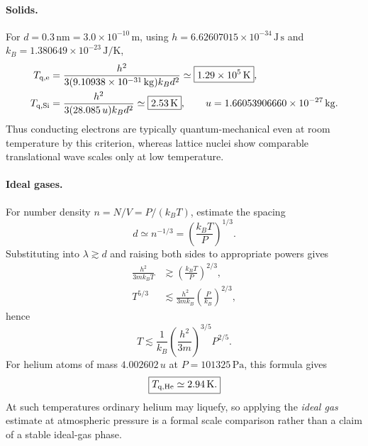 \paragraph{Solids.}
For $d=0.3\,\mathrm{nm}=3.0\times10^{-10}\,\mathrm{m}$, using $h=6.62607015\times10^{-34}\,\mathrm{J\,s}$ and $k_B=1.380649\times10^{-23}\,\mathrm{J/K}$,
\begin{align}
T_{\rm q,e}&=
\frac{h^2}{3(9.10938\times10^{-31}\,\mathrm{kg})k_Bd^2}
\simeq\boxed{1.29\times10^5\,\mathrm K},\\
T_{\rm q,Si}&=
\frac{h^2}{3(28.085\,u)k_Bd^2}
\simeq\boxed{2.53\,\mathrm K},\qquad
u=1.66053906660\times10^{-27}\,\mathrm{kg}.
\end{align}
Thus conducting electrons are typically quantum-mechanical even at room temperature by this criterion, whereas lattice nuclei show comparable translational wave scales only at low temperature.
\paragraph{Ideal gases.}
For number density $n=N/V=P/(k_BT)$, estimate the spacing
\begin{equation}
d\simeq n^{-1/3}=\left(\frac{k_BT}{P}\right)^{1/3}.
\end{equation}
Substituting into $\lambda\gtrsim d$ and raising both sides to appropriate powers gives
\begin{align}
\frac{h^2}{3mk_BT}&\gtrsim\left(\frac{k_BT}{P}\right)^{2/3},\\
T^{5/3}&\lesssim\frac{h^2}{3mk_B}\left(\frac{P}{k_B}\right)^{2/3},
\end{align}
hence
\begin{equation}
\boxed{T\lesssim\frac1{k_B}\left(\frac{h^2}{3m}\right)^{3/5}P^{2/5}.}
\end{equation}
For helium atoms of mass $4.002602\,u$ at $P=101325\,\mathrm{Pa}$, this formula gives
\begin{equation}
\boxed{T_{\rm q,He}\simeq2.94\,\mathrm K.}
\end{equation}
At such temperatures ordinary helium may liquefy, so applying the \emph{ideal gas} estimate at atmospheric pressure is a formal scale comparison rather than a claim of a stable ideal-gas phase.
